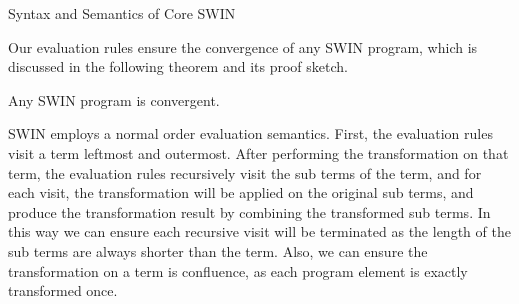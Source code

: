 \begin{section}{Syntax and Semantics of Core SWIN}

\smallskip
Our evaluation rules ensure the convergence of any SWIN program, which
is discussed in the following theorem and its proof sketch.
\begin{theorem}
  Any SWIN program is convergent.
\end{theorem}
\begin{proof-sketch}
SWIN employs a normal order evaluation semantics. First, the evaluation rules visit
a term leftmost and outermost. After performing the transformation on that term, the evaluation 
rules recursively visit the sub terms of the term, and for each visit, the transformation
will be applied on the original sub terms, and produce the transformation result by combining
the transformed sub terms. 
In this way we can ensure each recursive visit will be 
terminated as the length of the sub terms 
are always shorter than the term. Also, we can ensure the transformation on a term
is confluence, as each program element is exactly transformed once. %
\end{proof-sketch}
\end{section}
